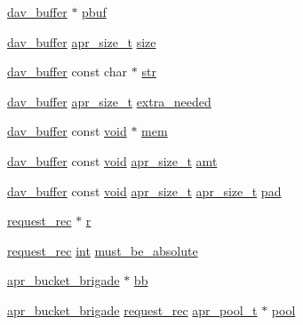 \begin{DoxyCompactItemize}
\hyperlink{structdav__buffer}{dav\+\_\+buffer} $\ast$ \hyperlink{group__MOD__DAV_gae1a94d2dbbb7065be386af579bdbe312}{pbuf}
\item 
\hyperlink{structdav__buffer}{dav\+\_\+buffer} \hyperlink{group__apr__platform_gaaa72b2253f6f3032cefea5712a27540e}{apr\+\_\+size\+\_\+t} \hyperlink{group__MOD__DAV_ga27ce0bf89fa123532a37277e6bca10f6}{size}
\item 
\hyperlink{structdav__buffer}{dav\+\_\+buffer} const char $\ast$ \hyperlink{group__MOD__DAV_ga645b5471f6fa6da283c82b7ea6a2b010}{str}
\item 
\hyperlink{structdav__buffer}{dav\+\_\+buffer} \hyperlink{group__apr__platform_gaaa72b2253f6f3032cefea5712a27540e}{apr\+\_\+size\+\_\+t} \hyperlink{group__MOD__DAV_ga3e7b13c5862c47c96b564314fe11d41d}{extra\+\_\+needed}
\item 
\hyperlink{structdav__buffer}{dav\+\_\+buffer} const \hyperlink{group__MOD__ISAPI_gacd6cdbf73df3d9eed42fa493d9b621a6}{void} $\ast$ \hyperlink{group__MOD__DAV_gac8d0feaae3f1c6b0eac72aaa9af557c1}{mem}
\item 
\hyperlink{structdav__buffer}{dav\+\_\+buffer} const \hyperlink{group__MOD__ISAPI_gacd6cdbf73df3d9eed42fa493d9b621a6}{void} \hyperlink{group__apr__platform_gaaa72b2253f6f3032cefea5712a27540e}{apr\+\_\+size\+\_\+t} \hyperlink{group__MOD__DAV_ga9d0b8ad7f59b3495f813810d33bc3664}{amt}
\item 
\hyperlink{structdav__buffer}{dav\+\_\+buffer} const \hyperlink{group__MOD__ISAPI_gacd6cdbf73df3d9eed42fa493d9b621a6}{void} \hyperlink{group__apr__platform_gaaa72b2253f6f3032cefea5712a27540e}{apr\+\_\+size\+\_\+t} \hyperlink{group__apr__platform_gaaa72b2253f6f3032cefea5712a27540e}{apr\+\_\+size\+\_\+t} \hyperlink{group__MOD__DAV_gace179413e6bb5f28178968aaf55ff4f6}{pad}
\item 
\hyperlink{structrequest__rec}{request\+\_\+rec} $\ast$ \hyperlink{group__MOD__DAV_gac68e921ed15f71060d618adb662a84f6}{r}
\item 
\hyperlink{structrequest__rec}{request\+\_\+rec} \hyperlink{pcre_8txt_a42dfa4ff673c82d8efe7144098fbc198}{int} \hyperlink{group__MOD__DAV_ga3ef31f51e842b1a8129709ce7c811c8d}{must\+\_\+be\+\_\+absolute}
\item 
\hyperlink{structapr__bucket__brigade}{apr\+\_\+bucket\+\_\+brigade} $\ast$ \hyperlink{group__MOD__DAV_ga0b0eadb381dbe958da483f3d9fc9521a}{bb}
\item 
\hyperlink{structapr__bucket__brigade}{apr\+\_\+bucket\+\_\+brigade} \hyperlink{structrequest__rec}{request\+\_\+rec} \hyperlink{structapr__pool__t}{apr\+\_\+pool\+\_\+t} $\ast$ \hyperlink{group__MOD__DAV_ga35230907c170df5d4d7f0ca99274c574}{pool}

\end{DoxyCompactItemize}
